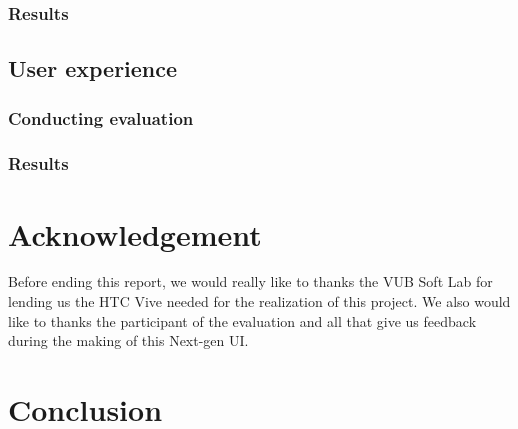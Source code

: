 \documentclass[11pt,a4paper]{article}
\begin{document}

\subsubsection{Results}

\subsection{User experience}


\subsubsection{Conducting evaluation}

\subsubsection{Results}



\section{Acknowledgement}

Before ending this report, we would really like to thanks the VUB Soft Lab for lending us the HTC Vive needed for the realization of this project.
We also would like to thanks the participant of the evaluation and all that give us feedback during the making of this Next-gen UI.

\section{Conclusion}
\end{document}
